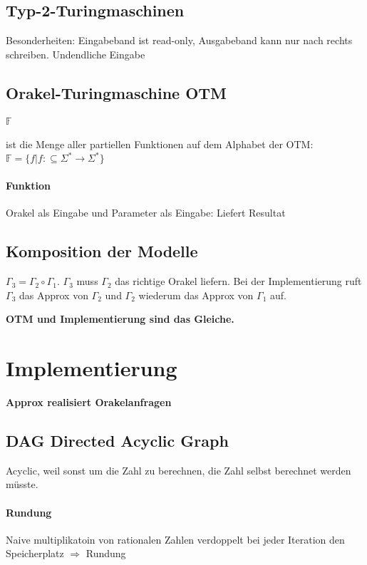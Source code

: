 \documentclass[ngerman]{scrartcl}
\begin{document}
\subsection{Typ-2-Turingmaschinen}
Besonderheiten: Eingabeband ist read-only, Ausgabeband kann nur nach rechts schreiben. Undendliche Eingabe 


\subsection{Orakel-Turingmaschine OTM}
\paragraph{$ \mathbb{F} $} 
ist die Menge aller partiellen Funktionen auf dem Alphabet der OTM: \\ 
 $ \mathbb{F} = \{ f | f: \subseteq \Sigma^* \rightarrow  \Sigma^* \}$
\paragraph{Funktion} Orakel als Eingabe und Parameter als Eingabe: Liefert Resultat

\subsection{Komposition der Modelle}
$ \Gamma_3 = \Gamma_2 \circ \Gamma_1 $. $ \Gamma_3 $ muss $ \Gamma_2 $ das richtige Orakel liefern. Bei der Implementierung ruft $ \Gamma_3 $ das Approx von $ \Gamma_2 $ und $ \Gamma_2 $ wiederum das Approx von $ \Gamma_1 $ auf.

\textbf{OTM und Implementierung sind das Gleiche.}

\section{Implementierung}
\textbf{Approx realisiert Orakelanfragen}


\subsection{DAG Directed Acyclic Graph}
Acyclic, weil sonst um die Zahl zu berechnen, die Zahl selbst berechnet werden müsste.

\paragraph{Rundung} Naive multiplikatoin von rationalen Zahlen verdoppelt bei jeder Iteration den Speicherplatz $ \Rightarrow $ Rundung 
\end{document}
